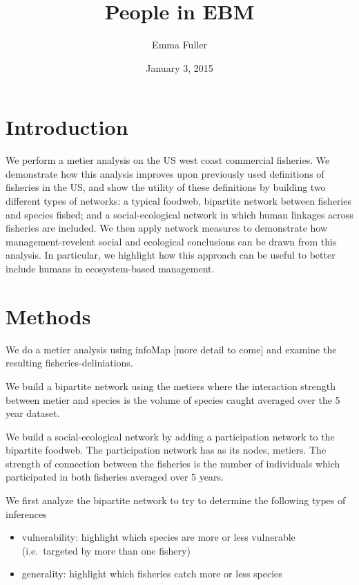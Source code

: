 \documentclass[]{article}
\title{People in EBM}
\author{Emma Fuller}
\date{January 3, 2015}
\begin{document}
\maketitle


\section{Introduction}\label{introduction}

We perform a metier analysis on the US west coast commercial fisheries.
We demonstrate how this analysis improves upon previously used
definitions of fisheries in the US, and show the utility of these
definitions by building two different types of networks: a typical
foodweb, bipartite network between fisheries and species fished; and a
social-ecological network in which human linkages across fisheries are
included. We then apply network measures to demonstrate how
management-revelent social and ecological conclusions can be drawn from
this analysis. In particular, we highlight how this approach can be
useful to better include humans in ecosystem-based management.

\section{Methods}\label{methods}

We do a metier analysis using infoMap {[}more detail to come{]} and
examine the resulting fisheries-deliniations.

We build a bipartite network using the metiers where the interaction
strength between metier and species is the volume of species caught
averaged over the 5 year dataset.

We build a social-ecological network by adding a participation network
to the bipartite foodweb. The participation network has as its nodes,
metiers. The strength of connection between the fisheries is the number
of individuals which participated in both fisheries averaged over 5
years.

We first analyze the bipartite network to try to determine the following
types of inferences

\begin{itemize}
\itemsep1pt\parskip0pt
\item
  vulnerability: highlight which species are more or less vulnerable
  (i.e.~targeted by more than one fishery)
\item
  generality: highlight which fisheries catch more or less species
\end{itemize}
\end{document}
